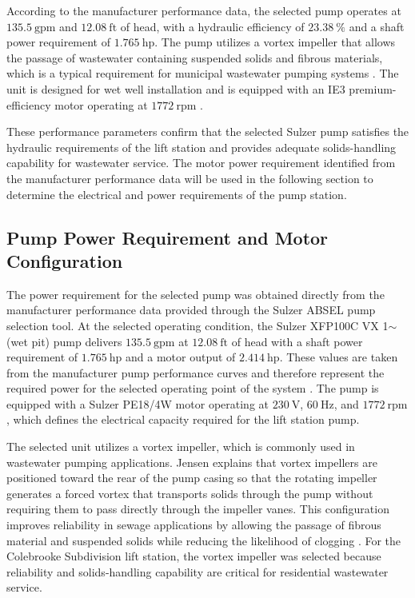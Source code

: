 According to the manufacturer performance data, the selected pump operates at $135.5~\text{gpm}$ and $12.08~\text{ft}$ of head, with a hydraulic efficiency of $23.38~\%$ and a shaft power requirement of $1.765~\text{hp}$. The pump utilizes a vortex impeller that allows the passage of wastewater containing suspended solids and fibrous materials, which is a typical requirement for municipal wastewater pumping systems \cite{MetcalfEddy_Wastewater_2014}. The unit is designed for wet well installation and is equipped with an IE3 premium-efficiency motor operating at $1772~\text{rpm}$ \cite{Sulzer_PumpCatalog_2024}.

These performance parameters confirm that the selected Sulzer pump satisfies the hydraulic requirements of the lift station and provides adequate solids-handling capability for wastewater service. The motor power requirement identified from the manufacturer performance data will be used in the following section to determine the electrical and power requirements of the pump station.


\subsection{Pump Power Requirement and Motor Configuration}

The power requirement for the selected pump was obtained directly from the manufacturer performance data provided through the Sulzer ABSEL pump selection tool. At the selected operating condition, the Sulzer XFP100C VX 1$\sim$ (wet pit) pump delivers $135.5~\text{gpm}$ at $12.08~\text{ft}$ of head with a shaft power requirement of $1.765~\text{hp}$ and a motor output of $2.414~\text{hp}$. These values are taken from the manufacturer pump performance curves and therefore represent the required power for the selected operating point of the system \cite{Sulzer_ABSEL,Sulzer_PumpCatalog_2024}. The pump is equipped with a Sulzer PE18/4W motor operating at $230~\text{V}$, $60~\text{Hz}$, and $1772~\text{rpm}$, which defines the electrical capacity required for the lift station pump.

The selected unit utilizes a vortex impeller, which is commonly used in wastewater pumping applications. Jensen explains that vortex impellers are positioned toward the rear of the pump casing so that the rotating impeller generates a forced vortex that transports solids through the pump without requiring them to pass directly through the impeller vanes. This configuration improves reliability in sewage applications by allowing the passage of fibrous material and suspended solids while reducing the likelihood of clogging \cite{Jensen_PumpStationDesignGuidelines_2012}. For the Colebrooke Subdivision lift station, the vortex impeller was selected because reliability and solids-handling capability are critical for residential wastewater service.

